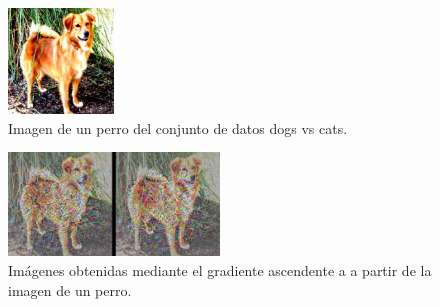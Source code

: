 \begin{figure}[H]
    \begin{small}
        \begin{center}
            \includegraphics[width=0.25\textwidth]{Figs/perr2_init_img_epochs_50.pdf}
        \end{center}
        \caption{Imagen de un perro del conjunto de datos dogs vs cats.}
        \label{fig:perro_init}
    \end{small}
\end{figure}

\vfill\null


\begin{figure}[H]
    \begin{small}
        \begin{center}
            \includegraphics[width=0.5\textwidth]{Figs/perr2_filters_epochs_50.pdf}
        \end{center}
        \caption{Imágenes obtenidas mediante el gradiente ascendente a a partir de la imagen de un perro.}
        \label{fig:perro_filters}
    \end{small}
\end{figure}






